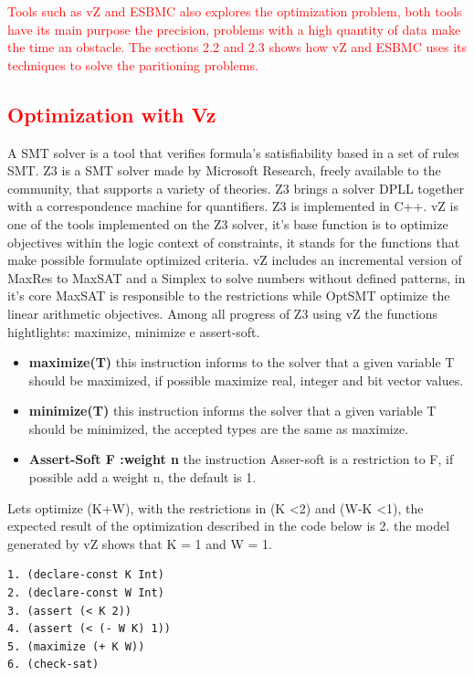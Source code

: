 \textcolor{red}{Tools such as vZ and ESBMC also explores the optimization problem, both tools have its main purpose the precision, problems with a high quantity of data make the time an obstacle. The sections 2.2 and 2.3 shows how vZ and ESBMC uses its techniques to solve the paritioning problems.}


\subsection{\textcolor{Red}{Optimization with Vz}}

A SMT solver is a tool that verifies formula's satisfiability based in a set of rules SMT. Z3 is a SMT solver made by Microsoft Research, freely available to the community, that supports a variety of theories. Z3 brings a solver DPLL together with a correspondence machine for quantifiers. Z3 is implemented in C++.
vZ is one of the tools implemented on the Z3 solver, it's base function is to optimize objectives within the logic context of constraints, it stands for the functions that make possible formulate optimized criteria.
vZ includes an incremental version of MaxRes to MaxSAT and a Simplex to solve numbers without defined patterns, in it's core MaxSAT is responsible to the restrictions while OptSMT optimize the linear arithmetic objectives.
Among all progress of Z3 using vZ the functions hightlights: maximize, minimize e assert-soft.

\begin{itemize}
\item{\textbf{maximize(T)}
this instruction informs to the solver that a given variable T should be maximized, if possible maximize real, integer and bit vector values.}
\item{\textbf{minimize(T)}
this instruction informs the solver that a given variable T should be minimized, the accepted types are the same as maximize.}
\item{\textbf{Assert-Soft F :weight n}
the instruction Asser-soft is a restriction to F, if possible add a weight n, the default is 1.}
\end{itemize}

Lets optimize (K+W), with the restrictions in (K \textless 2) and (W-K \textless 1), the expected result of the optimization described in the code below is 2. the model generated by vZ shows that K = 1 and W = 1.

\begin{lstlisting}[caption=Code SMT using vZ, label=vZ]
1. (declare-const K Int) 
2. (declare-const W Int)
3. (assert (< K 2)) 
4. (assert (< (- W K) 1))
5. (maximize (+ K W)) 
6. (check-sat)
\end{lstlisting}


